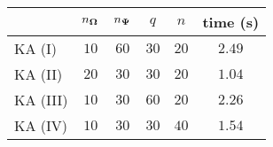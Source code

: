 \centering
\renewcommand{\arraystretch}{1.2}
\begin{tabular}{@{}lccccc@{}}
\toprule
 & $n_{\boldsymbol{\Omega}}$ & $n_{\boldsymbol{\Psi}}$ & $q$ & $n$ & time (s)\\
\midrule
KA (I) & $10$ & $60$ & $30$ & $20$ & $2.49$ \\
KA (II) & $20$ & $30$ & $30$ & $20$ & $1.04$ \\
KA (III) & $10$ & $30$ & $60$ & $20$ & $2.26$ \\
KA (IV) & $10$ & $30$ & $30$ & $40$ & $1.54$ \\
\bottomrule
\end{tabular}
